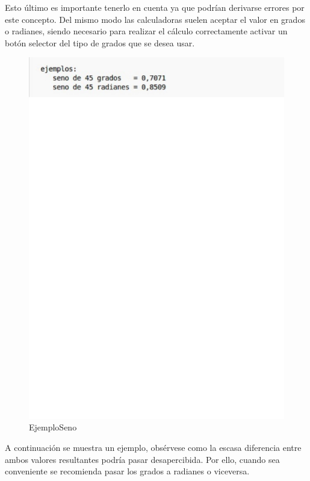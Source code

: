   Esto último es importante tenerlo en cuenta ya que podrían derivarse errores
por este concepto. Del mismo modo las calculadoras suelen aceptar el valor 
en grados o radianes, siendo necesario para realizar el cálculo correctamente
activar un botón selector del tipo de grados que se desea usar.

\begin{figure}[h]
\begin{center}
\includegraphics[scale=0.55]{images/ejemplo_seno.eps}
\end{center}
\caption{EjemploSeno}
\label{graph:4}
\end{figure}

  A continuación se muestra un ejemplo, obsérvese como la escasa diferencia entre
ambos valores resultantes podría pasar desapercibida. Por ello, cuando sea conveniente
se recomienda pasar los grados a radianes o viceversa.


